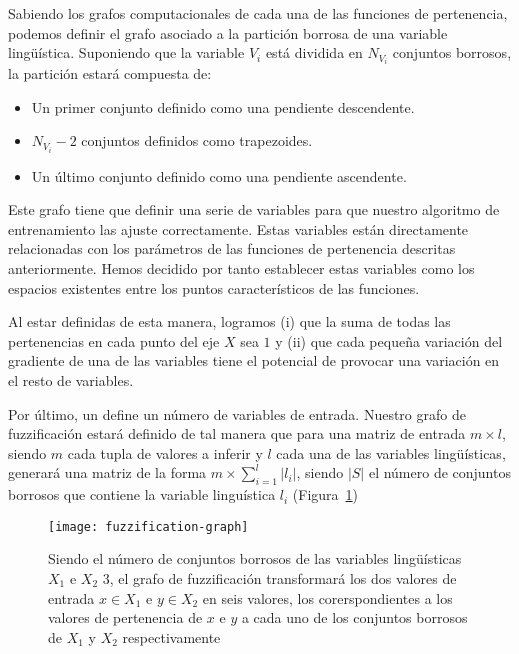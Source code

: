 Sabiendo los grafos computacionales de cada una de las funciones de pertenencia, podemos definir el grafo asociado a la partición borrosa de una variable lingüística. Suponiendo que la variable $V_i$ está dividida en $N_{V_i}$ conjuntos borrosos, la partición estará compuesta de:

\begin{itemize}
	\item Un primer conjunto definido como una pendiente descendente.
	\item $N_{V_i} - 2$ conjuntos definidos como trapezoides.
	\item Un último conjunto definido como una pendiente ascendente.
\end{itemize}

Este grafo tiene que definir una serie de variables para que nuestro algoritmo de entrenamiento las ajuste correctamente. Estas variables están directamente relacionadas con los parámetros de las funciones de pertenencia descritas anteriormente. Hemos decidido por tanto establecer estas variables como los espacios existentes entre los puntos característicos de las funciones.

Al estar definidas de esta manera, logramos (i) que la suma de todas las pertenencias en cada punto del eje $X$ sea $1$ y (ii) que cada pequeña variación del gradiente de una de las variables tiene el potencial de provocar una variación en el resto de variables.

Por último, un  define un número de variables de entrada. Nuestro grafo de fuzzificación estará definido de tal manera que para una matriz de entrada $m \times l$, siendo $m$ cada tupla de valores a inferir y $l$ cada una de las variables lingüísticas, generará una matriz de la forma $m \times \sum_{i=1}^l \left\vert{l_i}\right\vert$, siendo $\left\vert{S}\right\vert$ el número de conjuntos borrosos que contiene la variable linguística $l_i$ (Figura~\ref{fig:fuzzification-graph})

\begin{figure}
	\centering
	\texttt{[image: fuzzification-graph]}
	\caption[Ejemplo de operación de fuzzificación como grafo computacional]{Siendo el número de conjuntos borrosos de las variables lingüísticas $X_1$ e $X_2$ $3$, el grafo de fuzzificación transformará los dos valores de entrada $x \in X_1$ e $y \in X_2$ en seis valores, los corerspondientes a los valores de pertenencia de $x$ e $y$ a cada uno de los conjuntos borrosos de $X_1$ y $X_2$ respectivamente}
	\label{fig:fuzzification-graph}
\end{figure}


